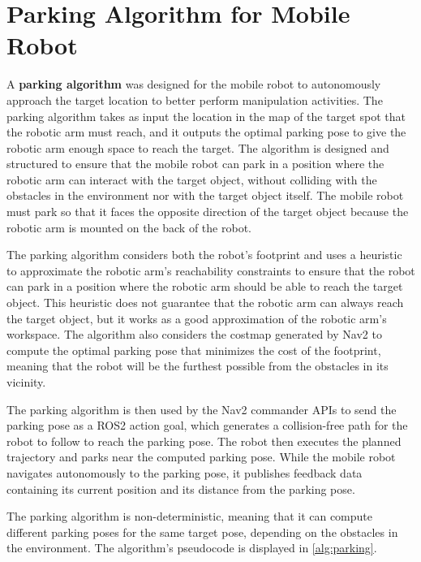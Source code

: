 \section{Parking Algorithm for Mobile Robot}

A \textbf{parking algorithm} was designed for the mobile robot to autonomously approach the target location
to better perform manipulation activities.
The parking algorithm takes as input the location in the map of the target spot that the robotic arm must reach,
and it outputs the optimal parking pose to give the robotic arm
enough space to reach the target. The algorithm is designed and structured to ensure that the mobile robot
can park in a position where the robotic arm can interact with the target object, without colliding with 
the obstacles in the environment nor with the target object itself. The mobile robot must park so that it 
faces the opposite direction of the target object because the robotic arm is mounted on the back of the robot.

The parking algorithm considers both the robot's footprint and uses a heuristic to approximate the robotic arm's
reachability constraints to ensure that the robot can park in a position where the robotic arm should be able 
to reach the target object. This heuristic does not guarantee that the robotic arm can always reach the target object,
but it works as a good approximation of the robotic arm's workspace.
The algorithm also considers the costmap generated by Nav2 to compute the optimal parking
pose that minimizes the cost of the footprint, meaning that the robot will be the furthest possible from
the obstacles in its vicinity. 

The parking algorithm is then used by the Nav2 commander APIs to send the parking pose as a ROS2 action goal,
which generates a collision-free path for the robot to follow to reach the parking pose. The robot then executes
the planned trajectory and parks near the computed parking pose. While the mobile robot navigates
autonomously to the parking pose, it publishes feedback data containing its current position and its distance 
from the parking pose. 

The parking algorithm is non-deterministic, meaning that it can compute different parking poses for the same target
pose, depending on the obstacles in the environment. The algorithm's pseudocode is displayed in \ref{alg:parking}.

